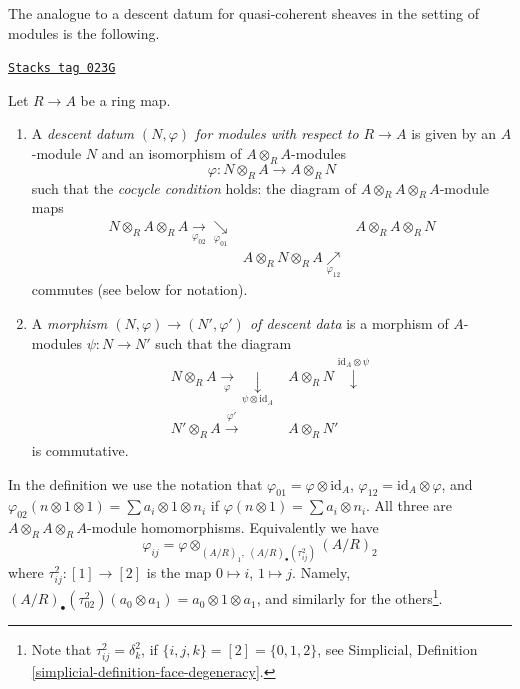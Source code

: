 \medskip\noindent
The analogue to a descent datum
for quasi-coherent sheaves in the setting of modules is the following.

\begin{definition}
\label{descent-definition-descent-datum-modules}
\href{https://stacks.math.columbia.edu/tag/023G}{\texttt{Stacks tag 023G}}

Let $R \to A$ be a ring map.
\begin{enumerate}
\item A {\it descent datum $(N, \varphi)$ for modules
with respect to $R \to A$}
is given by an $A$-module $N$ and an isomorphism of
$A \otimes_R A$-modules
$$
\varphi : N \otimes_R A \to A \otimes_R N
$$
such that the {\it cocycle condition} holds: the diagram
of $A \otimes_R A \otimes_R A$-module maps
$$
\begin{array}{ccc}N \otimes_R A \otimes_R A \underset{\varphi_{02}}{\longrightarrow}\underset{\varphi_{01}}{\searrow} &  & A \otimes_R A \otimes_R N \\  & A \otimes_R N \otimes_R A \underset{\varphi_{12}}{\nearrow} & \end{array}
$$
commutes (see below for notation).
\item A {\it morphism $(N, \varphi) \to (N', \varphi')$ of descent data}
is a morphism of $A$-modules $\psi : N \to N'$ such that
the diagram
$$
\begin{array}{cc}N \otimes_R A \underset{\varphi}{\longrightarrow}\underset{\psi \otimes \text{id}_A}{\downarrow} & A \otimes_R N \overset{\text{id}_A \otimes \psi}{\downarrow} \\ N' \otimes_R A \overset{\varphi'}{\longrightarrow} & A \otimes_R N'\end{array}
$$
is commutative.
\end{enumerate}
\end{definition}

In the definition we use the notation that
$\varphi_{01} = \varphi \otimes \text{id}_A$,
$\varphi_{12} = \text{id}_A \otimes \varphi$, and
$\varphi_{02}(n \otimes 1 \otimes 1) = \sum a_i \otimes 1 \otimes n_i$
if $\varphi(n \otimes 1) = \sum a_i \otimes n_i$. All three are
$A \otimes_R A \otimes_R A$-module homomorphisms. Equivalently we have
$$
\varphi_{ij}
=
\varphi \otimes_{(A/R)_1, \ (A/R)_\bullet(\tau^2_{ij})} (A/R)_2
$$
where $\tau^2_{ij} : [1] \to [2]$ is the map
$0 \mapsto i$, $1 \mapsto j$. Namely,
$(A/R)_{\bullet}(\tau^2_{02})(a_0 \otimes a_1) =
a_0 \otimes 1 \otimes a_1$,
and similarly for the others\footnote{Note that
$\tau^2_{ij} = \delta^2_k$, if $\{i, j, k\} = [2] = \{0, 1, 2\}$,
see Simplicial, Definition \ref{simplicial-definition-face-degeneracy}.}.

